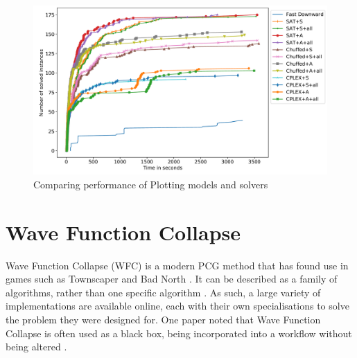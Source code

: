 \begin{figure}[H]
    \centering
    \includegraphics[width=\textwidth, height=0.3\textheight, keepaspectratio]{Images/PlottingSolverComparison.png}
    \caption{Comparing performance of Plotting models and solvers  \cite{Plotting_Planning_Problem}}
    \label{fig:plottingSolverComparison}
\end{figure}


\section{Wave Function Collapse}
Wave Function Collapse (WFC) \cite{Gumin_Wave_Function_Collapse_2016} is a modern PCG method that has found use in games such as Townscaper \cite{townscaper} and Bad North \cite{badnorth}. It can be described as a family of algorithms, rather than one specific algorithm \cite{WFC_ConstraintSolving_and_ML}. As such, a large variety of implementations are available online, each with their own specialisations to solve the problem they were designed for. One paper noted that Wave Function Collapse is often used as a black box, being incorporated into a workflow without being altered \cite{WFC_In_The_Wild}.

